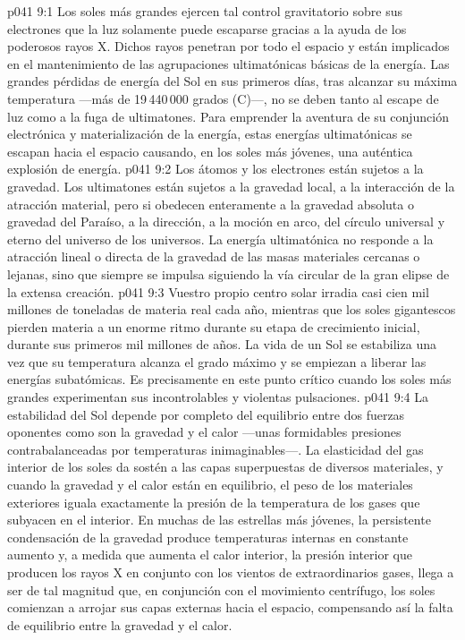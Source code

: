 \vs p041 9:1 Los soles más grandes ejercen tal control gravitatorio sobre sus electrones que la luz solamente puede escaparse gracias a la ayuda de los poderosos rayos X. Dichos rayos penetran por todo el espacio y están implicados en el mantenimiento de las agrupaciones ultimatónicas básicas de la energía. Las grandes pérdidas de energía del Sol en sus primeros días, tras alcanzar su máxima temperatura ---más de 19\,440\,000 grados (C)---, no se deben tanto al escape de luz como a la fuga de ultimatones. Para emprender la aventura de su conjunción electrónica y materialización de la energía, estas energías ultimatónicas se escapan hacia el espacio causando, en los soles más jóvenes, una auténtica explosión de energía.
\vs p041 9:2 \pc Los átomos y los electrones están sujetos a la gravedad. Los ultimatones  están sujetos a la gravedad local, a la interacción de la atracción material, pero si obedecen enteramente a la gravedad absoluta o gravedad del Paraíso, a la dirección, a la moción en arco, del círculo universal y eterno del universo de los universos. La energía ultimatónica no responde a la atracción lineal o directa de la gravedad de las masas materiales cercanas o lejanas, sino que siempre se impulsa siguiendo la vía circular de la gran elipse de la extensa creación.
\vs p041 9:3 \pc Vuestro propio centro solar irradia casi cien mil millones de toneladas de materia real cada año, mientras que los soles gigantescos pierden materia a un enorme ritmo durante su etapa de crecimiento inicial, durante sus primeros mil millones de años. La vida de un Sol se estabiliza una vez que su temperatura alcanza el grado máximo y se empiezan a liberar las energías subatómicas. Es precisamente en este punto crítico cuando los soles más grandes experimentan sus incontrolables y violentas pulsaciones.
\vs p041 9:4 La estabilidad del Sol depende por completo del equilibrio entre dos fuerzas oponentes como son la gravedad y el calor ---unas formidables presiones contrabalanceadas por temperaturas inimaginables---. La elasticidad del gas interior de los soles da sostén a las capas superpuestas de diversos materiales, y cuando la gravedad y el calor están en equilibrio, el peso de los materiales exteriores iguala exactamente la presión de la temperatura de los gases que subyacen en el interior. En muchas de las estrellas más jóvenes, la persistente condensación de la gravedad produce temperaturas internas en constante aumento y, a medida que aumenta el calor interior, la presión interior que producen los rayos X en conjunto con los vientos de extraordinarios gases, llega a ser de tal magnitud que, en conjunción con el movimiento centrífugo, los soles comienzan a arrojar sus capas externas hacia el espacio, compensando así la falta de equilibrio entre la gravedad y el calor.
